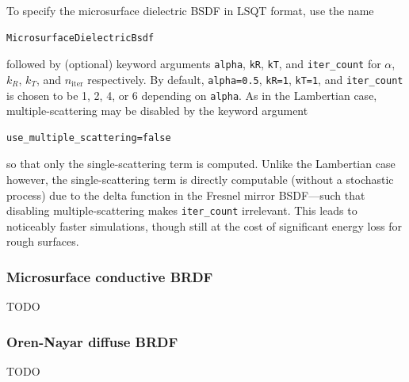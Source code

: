 \documentclass[
    twoside,
    twocolumn,
    letterpaper,
    10pt]{article}
\begin{document}
To specify the microsurface dielectric BSDF 
in LSQT format, use the name
\begin{lstlisting}
MicrosurfaceDielectricBsdf
\end{lstlisting}
followed by (optional) keyword arguments \texttt{alpha}, \texttt{kR},
\texttt{kT}, and \texttt{iter\_count} for $\alpha$, $k_R$, $k_T$, and 
$n_{\text{iter}}$ respectively. By default, \texttt{alpha=0.5},
\texttt{kR=1}, \texttt{kT=1}, and \texttt{iter\_count} is chosen to 
be 1, 2, 4, or 6 depending on \texttt{alpha}. As in the Lambertian case, 
multiple-scattering may be disabled by the keyword argument
\begin{lstlisting}
use_multiple_scattering=false
\end{lstlisting}
so that only the single-scattering term is computed. Unlike the
Lambertian case however, the single-scattering term is directly 
computable (without a stochastic process) due to the delta function 
in the Fresnel mirror BSDF---such that disabling multiple-scattering makes
\texttt{iter\_count} irrelevant. This leads to noticeably faster
simulations, though still at the cost of significant
energy loss for rough surfaces.

\subsubsection{Microsurface conductive BRDF}
\label{sec:doc-layers-microsurface-conductive}

TODO

\subsubsection{Oren-Nayar diffuse BRDF}
\label{sec:doc-layers-oren-nayar-diffuse}

TODO

{
\nocite{*}
\raggedright
\printbibliography
}
\end{document}
